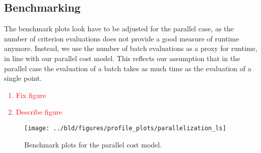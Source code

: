 \subsection{Benchmarking}\label{subsec:parallelization::benchmarking}

The benchmark plots look have to be adjusted for the parallel case, as the number of criterion
evaluations does not provide a good measure of runtime anymore. Instead, we use the number of batch
evaluations as a proxy for runtime, in line with our parallel cost model. This reflects our
assumption that in the parallel case the evaluation of a batch takes as much time as the evaluation
of a single point.

\textcolor{red}{
\begin{enumerate}
    \item Fix figure
    \item Describe figure
\end{enumerate}
}


\begin{figure}[ht]\label{fig:parallelization::benchmark}
    \texttt{[image: ../bld/figures/profile\_plots/parallelization\_ls]}
    \caption{Benchmark plots for the parallel cost model.}
\end{figure}
